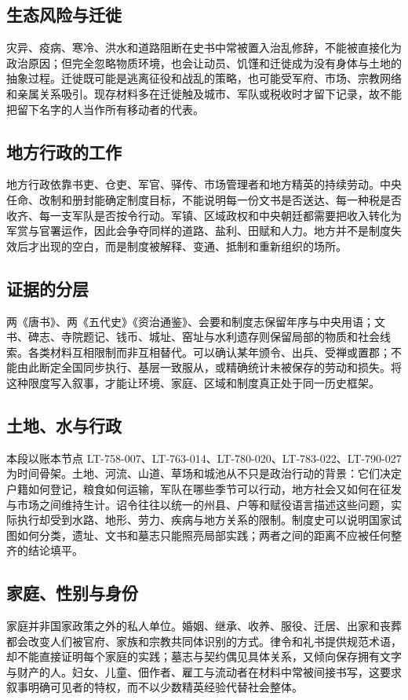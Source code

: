 \subsection{生态风险与迁徙}
灾异、疫病、寒冷、洪水和道路阻断在史书中常被置入治乱修辞，不能被直接化为政治原因；但完全忽略物质环境，也会让动员、饥馑和迁徙成为没有身体与土地的抽象过程。迁徙既可能是逃离征役和战乱的策略，也可能受军府、市场、宗教网络和亲属关系吸引。现存材料多在迁徙触及城市、军队或税收时才留下记录，故不能把留下名字的人当作所有移动者的代表。

\subsection{地方行政的工作}
地方行政依靠书吏、仓吏、军官、驿传、市场管理者和地方精英的持续劳动。中央任命、改制和册封能确定制度目标，不能说明每一份文书是否送达、每一种税是否收齐、每一支军队是否按令行动。军镇、区域政权和中央朝廷都需要把收入转化为军赏与官署运作，因此会争夺同样的道路、盐利、田赋和人力。地方并不是制度失效后才出现的空白，而是制度被解释、变通、抵制和重新组织的场所。

\subsection{证据的分层}
两《唐书》、两《五代史》《资治通鉴》、会要和制度志保留年序与中央用语；文书、碑志、寺院题记、钱币、城址、窑址与水利遗存则保留局部的物质和社会线索。各类材料互相限制而非互相替代。可以确认某年颁令、出兵、受禅或置郡；不能由此断定全国同步执行、基层一致服从，或精确统计未被保存的劳动和损失。将这种限度写入叙事，才能让环境、家庭、区域和制度真正处于同一历史框架。
\subsection{土地、水与行政}
本段以账本节点 LT-758-007、LT-763-014、LT-780-020、LT-783-022、LT-790-027 为时间骨架。土地、河流、山道、草场和城池从不只是政治行动的背景：它们决定户籍如何登记，粮食如何运输，军队在哪些季节可以行动，地方社会又如何在征发与市场之间维持生计。诏令往往以统一的州县、户等和赋役语言描述这些问题，实际执行却受到水路、地形、劳力、疾病与地方关系的限制。制度史可以说明国家试图如何分类，遗址、文书和墓志只能照亮局部实践；两者之间的距离不应被任何整齐的结论填平。

\subsection{家庭、性别与身份}
家庭并非国家政策之外的私人单位。婚姻、继承、收养、服役、迁居、出家和丧葬都会改变人们被官府、家族和宗教共同体识别的方式。律令和礼书提供规范术语，却不能直接证明每个家庭的实践；墓志与契约偶见具体关系，又倾向保存拥有文字与财产的人。妇女、儿童、佃作者、雇工与流动者在材料中常被间接书写，这要求叙事明确可见者的特权，而不以少数精英经验代替社会整体。

